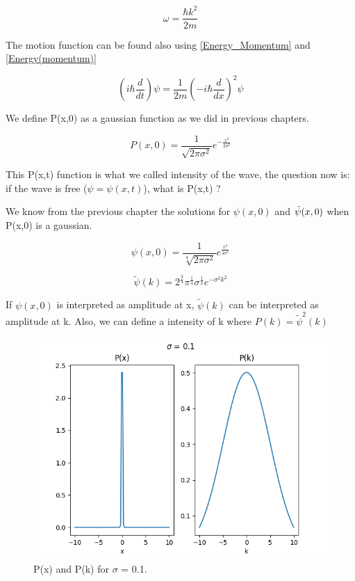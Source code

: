 \begin{equation}
    \label{2.27}
    \omega = \frac{\hbar k^2}{2m}
\end{equation}

The motion function can be found also using \ref{Energy_Momentum} and \ref{Energy(momentum)} 

\begin{equation}
    \label{2.28}
    \left(i\hbar\frac{d}{dt} \right)\psi = \frac{1}{2m}\left(-i\hbar\frac{d}{dx} \right)^2 \psi 
\end{equation}

We define P(x,0) as a gaussian function as we did in previous chapters.

\begin{equation}
    \label{2.29}
    P(x,0) = \frac{1}{\sqrt{2\pi\sigma^2}}e^{-\frac{x^2}{2\sigma^2}} 
\end{equation}

This P(x,t) function is what we called intensity of the wave, the question now is: if the wave is free ($\psi=\psi(x,t)$), what is P(x,t) ?  

We know from the previous chapter the solutions for $\psi(x,0)$ and $\Tilde{\psi}(x,0)$ when P(x,0) is a gaussian. 

\begin{equation}
    \label{2.30}
    \psi(x,0) = \frac{1}{\sqrt[4]{2\pi\sigma^2}} e^{\frac{x^2}{4\sigma^2}}
\end{equation} 

\begin{equation}
    \label{2.31}
    \tilde{\psi}(k) = 2^\frac{3}{4} \pi^\frac{1}{4} \sigma^\frac{1}{2} e^{-\sigma^2 k^2} 
\end{equation} 

If  $\psi(x,0)$ is interpreted as amplitude at x, $\tilde{\psi}(k)$ can be interpreted as amplitude at k. Also, we can define a intensity of k where $P(k) = \tilde{\psi}^2(k)$

\begin{figure}[h]
    \centering
    \includegraphics{images2/P_x&P_k_sigma=0.1.png}
    \caption{P(x) and P(k) for $\sigma$ = 0.1.}
\end{figure}

